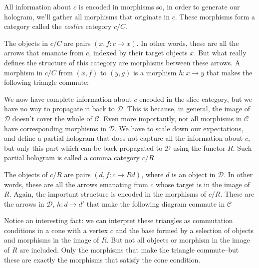 \documentclass[11pt]{amsart}
\begin{document}
All information about $c$ is encoded in morphisms so, in order to generate our hologram, we'll gather all morphisms that originate in $c$. These morphisms form a category called the \emph{coslice} category $c/C$. 

The objects in $c/C$ are pairs $(x, f \colon c \to x)$. In other words, these are all the arrows that emanate from $c$, indexed by their target objects $x$. But what really defines the structure of this category are morphisms between these arrows. A morphism in $c/C$ from $(x, f)$ to $(y, g)$ is a morphism $h \colon x \to y$ that makes the following triangle commute:

\begin{figure}[H]
\centering
\end{figure}

We now have complete information about $c$ encoded in the slice category, but we have no way to propagate it back to $\mathcal D$. This is because, in general, the image of $\mathcal D$ doesn't cover the whole of $\mathcal C$. Even more importantly, not all morphisms in $\mathcal C$ have corresponding morphisms in $\mathcal D$. We have to scale down our expectations, and define a partial hologram that does not capture all the information about $c$, but only this part which can be back-propagated to $\mathcal D$ using the functor $R$. Such partial hologram is called a comma category $c/R$.

The objects of $c/R$ are pairs $(d, f \colon c \to R d)$, where $d$ is an object in $\mathcal D$. In other words, these are all the arrows emanating from $c$ whose target is in the image of $R$. Again, the important structure is encoded in the morphisms of $c/R$. These are the arrows in $\mathcal D$, $h \colon d \to d'$ that make the following diagram commute in $\mathcal C$

\begin{figure}[H]
\centering
\end{figure}
Notice an interesting fact: we can interpret these triangles as commutation conditions in a cone with a vertex $c$ and the base formed by a selection of objects and morphisms in the image of $R$. But not all objects or morphism in the image of $R$ are included. Only the morphisms that make the triangle commute--but these are exactly the morphisms that satisfy the cone condition. 
\end{document}

